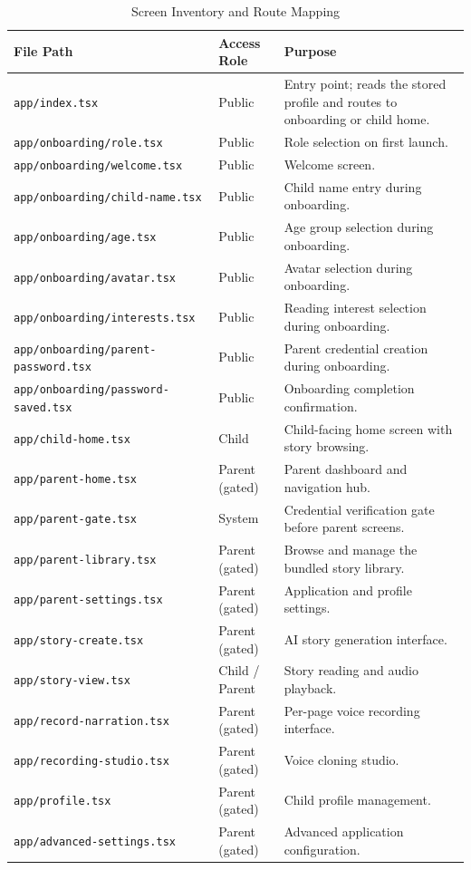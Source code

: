 \begin{table}[H]
\centering
\caption{Screen Inventory and Route Mapping}
\label{tab:screen_inventory}
\renewcommand{\arraystretch}{1.4}
\begin{tabularx}{\textwidth}{|>{\RaggedRight\arraybackslash}p{5.5cm}|>{\RaggedRight\arraybackslash}p{2.5cm}|>{\RaggedRight\arraybackslash}X|}
\hline
\textbf{File Path} & \textbf{Access Role} & \textbf{Purpose} \\
\hline
\texttt{app/index.tsx} & Public & Entry point; reads the stored profile and routes to onboarding or child home. \\
\hline
\texttt{app/onboarding/role.tsx} & Public & Role selection on first launch. \\
\hline
\texttt{app/onboarding/welcome.tsx} & Public & Welcome screen. \\
\hline
\texttt{app/onboarding/child-name.tsx} & Public & Child name entry during onboarding. \\
\hline
\texttt{app/onboarding/age.tsx} & Public & Age group selection during onboarding. \\
\hline
\texttt{app/onboarding/avatar.tsx} & Public & Avatar selection during onboarding. \\
\hline
\texttt{app/onboarding/interests.tsx} & Public & Reading interest selection during onboarding. \\
\hline
\texttt{app/onboarding/parent-password.tsx} & Public & Parent credential creation during onboarding. \\
\hline
\texttt{app/onboarding/password-saved.tsx} & Public & Onboarding completion confirmation. \\
\hline
\texttt{app/child-home.tsx} & Child & Child-facing home screen with story browsing. \\
\hline
\texttt{app/parent-home.tsx} & Parent (gated) & Parent dashboard and navigation hub. \\
\hline
\texttt{app/parent-gate.tsx} & System & Credential verification gate before parent screens. \\
\hline
\texttt{app/parent-library.tsx} & Parent (gated) & Browse and manage the bundled story library. \\
\hline
\texttt{app/parent-settings.tsx} & Parent (gated) & Application and profile settings. \\
\hline
\texttt{app/story-create.tsx} & Parent (gated) & AI story generation interface. \\
\hline
\texttt{app/story-view.tsx} & Child / Parent & Story reading and audio playback. \\
\hline
\texttt{app/record-narration.tsx} & Parent (gated) & Per-page voice recording interface. \\
\hline
\texttt{app/recording-studio.tsx} & Parent (gated) & Voice cloning studio. \\
\hline
\texttt{app/profile.tsx} & Parent (gated) & Child profile management. \\
\hline
\texttt{app/advanced-settings.tsx} & Parent (gated) & Advanced application configuration. \\
\hline
\end{tabularx}
\end{table}

